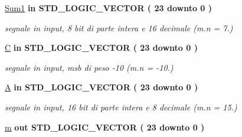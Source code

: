 \begin{DoxyCompactItemize}
\hyperlink{group___linear_regression_ga43a9a0da4f44006af5631ed5ee8ad924}{Sum1}  {\bfseries {\bfseries \textcolor{vhdlchar}{in}\textcolor{vhdlchar}{ }}} {\bfseries \textcolor{vhdlchar}{S\+T\+D\+\_\+\+L\+O\+G\+I\+C\+\_\+\+V\+E\+C\+T\+OR}\textcolor{vhdlchar}{ }\textcolor{vhdlchar}{(}\textcolor{vhdlchar}{ }\textcolor{vhdlchar}{ } \textcolor{vhdldigit}{23} \textcolor{vhdlchar}{ }\textcolor{vhdlchar}{downto}\textcolor{vhdlchar}{ }\textcolor{vhdlchar}{ } \textcolor{vhdldigit}{0} \textcolor{vhdlchar}{ }\textcolor{vhdlchar}{)}\textcolor{vhdlchar}{ }} 
\begin{DoxyCompactList}\small\item\em segnale in input, 8 bit di parte intera e 16 decimale (m.\+n = 7.) \end{DoxyCompactList}\item 
\hyperlink{group___linear_regression_ga17058a6bcb609074c49be51d09202870}{C}  {\bfseries {\bfseries \textcolor{vhdlchar}{in}\textcolor{vhdlchar}{ }}} {\bfseries \textcolor{vhdlchar}{S\+T\+D\+\_\+\+L\+O\+G\+I\+C\+\_\+\+V\+E\+C\+T\+OR}\textcolor{vhdlchar}{ }\textcolor{vhdlchar}{(}\textcolor{vhdlchar}{ }\textcolor{vhdlchar}{ } \textcolor{vhdldigit}{23} \textcolor{vhdlchar}{ }\textcolor{vhdlchar}{downto}\textcolor{vhdlchar}{ }\textcolor{vhdlchar}{ } \textcolor{vhdldigit}{0} \textcolor{vhdlchar}{ }\textcolor{vhdlchar}{)}\textcolor{vhdlchar}{ }} 
\begin{DoxyCompactList}\small\item\em segnale in input, msb di peso -\/10 (m.\+n = -\/10.) \end{DoxyCompactList}\item 
\hyperlink{group___linear_regression_gae1ad6503d157f6c26abdce1131d31ec2}{A}  {\bfseries {\bfseries \textcolor{vhdlchar}{in}\textcolor{vhdlchar}{ }}} {\bfseries \textcolor{vhdlchar}{S\+T\+D\+\_\+\+L\+O\+G\+I\+C\+\_\+\+V\+E\+C\+T\+OR}\textcolor{vhdlchar}{ }\textcolor{vhdlchar}{(}\textcolor{vhdlchar}{ }\textcolor{vhdlchar}{ } \textcolor{vhdldigit}{23} \textcolor{vhdlchar}{ }\textcolor{vhdlchar}{downto}\textcolor{vhdlchar}{ }\textcolor{vhdlchar}{ } \textcolor{vhdldigit}{0} \textcolor{vhdlchar}{ }\textcolor{vhdlchar}{)}\textcolor{vhdlchar}{ }} 
\begin{DoxyCompactList}\small\item\em segnale in input, 16 bit di parte intera e 8 decimale (m.\+n = 15.) \end{DoxyCompactList}\item 
\hyperlink{group___linear_regression_gad943f01112876248a4734aa3c3d2e3f2}{m}  {\bfseries {\bfseries \textcolor{vhdlchar}{out}\textcolor{vhdlchar}{ }}} {\bfseries \textcolor{vhdlchar}{S\+T\+D\+\_\+\+L\+O\+G\+I\+C\+\_\+\+V\+E\+C\+T\+OR}\textcolor{vhdlchar}{ }\textcolor{vhdlchar}{(}\textcolor{vhdlchar}{ }\textcolor{vhdlchar}{ } \textcolor{vhdldigit}{23} \textcolor{vhdlchar}{ }\textcolor{vhdlchar}{downto}\textcolor{vhdlchar}{ }\textcolor{vhdlchar}{ } \textcolor{vhdldigit}{0} \textcolor{vhdlchar}{ }\textcolor{vhdlchar}{)}\textcolor{vhdlchar}{ }} 

\end{DoxyCompactItemize}
